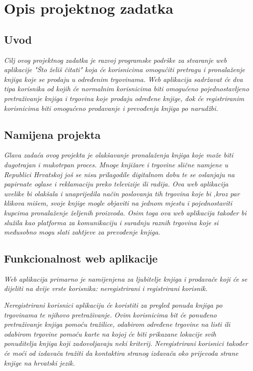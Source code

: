 \chapter{Opis projektnog zadatka}

	\section{Uvod}
	
		\textit{Cilj ovog projektnog zadatka je razvoj programske podrške za stvaranje web aplikacije "Što želiš čitati" koja će korisnicima omogućiti pretragu i pronalaženje knjiga koje se prodaju u određenim trgovinama. Web aplikacija sadržavat će dva tipa korisnika od kojih će normalnim korisnicima biti omogućeno pojednostavljeno pretraživanje knjiga i trgovina koje prodaju određene knjige, dok će registriranim korisnicima biti omogućeno prodavanje i prevođenja knjiga po narudžbi.}
		
	\section{Namijena projekta}
	
		\textit{Glava zadaća ovog projekta je olakšavanje pronalaženja knjiga koje može biti dugotrajan i mukotrpan proces. Mnoge knjižare i trgovine slične namjene u Republici Hrvatskoj još se nisu prilagodile digitalnom dobu te se oslanjaju na papirnate oglase i reklamaciju preko televizije ili radija. Ova web aplikacija uvelike bi olakšala i unaprijedila način poslovanja tih trgovina koje bi ,kroz par klikova mišem, svoje knjige mogle objaviti na jednom mjestu i pojednostaviti kupcima pronalaženje željenih proizvoda. Osim toga ova web aplikacija također bi služila kao platforma za komunikaciju i suradnju raznih trgovina koje si međusobno mogu slati zahtjeve za prevođenje knjiga.}
		
	\section{Funkcionalnost web aplikacije}
	
	\textit{Web aplikacija primarno je namijenjena za ljubitelje knjiga i prodavače koji će se dijeliti na dvije vrste korisnika: neregistrirani i registrirani korisnik.}
	
	\textit{Neregistrirani korisnici aplikaciju će koristiti za pregled ponuda knjiga po trgovinama te njihovo pretraživanje. Ovim korisnicima bit će ponuđeno pretraživanje knjiga pomoću tražilice, odabirom određene trgovine na listi ili odabirom trgovine pomoću karte na kojoj će biti prikazane lokacije svih ponuditelja knjiga koji zadovoljavaju neki kriterij. Neregistrirani korisnici također će moći od izdavača tražiti da kontaktira stranog izdavača oko prijevoda strane knjige na hrvatski jezik.}
	
